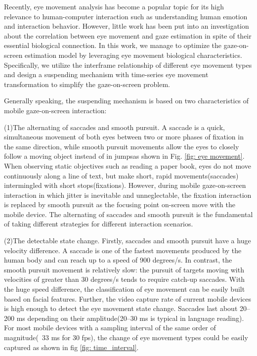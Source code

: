 \documentclass[acmlarge]{acmart}
\begin{document}
Recently, eye movement analysis has become a popular topic for its high relevance to human-computer interaction such as understanding human emotion\cite{alghowinem2013eye} and interaction behavior\cite{lin2019eog}. However, little work has been put into an investigation about the correlation between eye movement and gaze estimation in spite of their essential biological connection. In this work, we manage to optimize the gaze-on-screen estimation model by leveraging eye movement biological characteristics. Specifically, we utilize the interframe relationship of different eye movement types and design a suspending mechanism with time-series eye movement transformation to simplify the gaze-on-screen problem.



Generally speaking, the suspending mechanism is based on two characteristics of mobile gaze-on-screen interaction:

(1)The alternating of saccades and smooth pursuit. A saccade is a quick, simultaneous movement of both eyes between two or more phases of fixation in the same direction\cite{fuchs1967saccadic}, while smooth pursuit movements allow the eyes to closely follow a moving object instead of in jumps\cite{grasse1992analysis}as shown in Fig. \ref{fig: eye movement}. When observing static objectives such as reading a paper book, eyes do not move continuously along a line of text, but make short, rapid movements(saccades) intermingled with short stops(fixations)\cite{o1980control}. However, during mobile gaze-on-screen interaction in which jitter is inevitable and unneglectable\cite{peguero2016assessing}, the fixation interaction is replaced by smooth pursuit as the focusing point on-screen move with the mobile device. The alternating of saccades and smooth pursuit is the fundamental of taking different strategies for different interaction scenarios.

(2)The detectable state change. Firstly, saccades and smooth pursuit have a huge velocity difference. A saccade is one of the fastest movements produced by the human body and can reach up to a speed of 900 degrees/s\cite{fuchs1967saccadic}. In contrast, the smooth pursuit movement is relatively slow: the pursuit of targets moving with velocities of greater than 30 degrees/s tends to require catch-up saccades\cite{britannica1987sensory}. With the huge speed difference, the classification of eye movement can be easily built based on facial features. Further, the video capture rate of current mobile devices is high enough to detect the eye movement state change. Saccades last about 20–200 ms depending on their amplitude(20–30 ms is typical in language reading)\cite{afflerbach2015handbook}. For most mobile devices with a sampling interval of the same order of magnitude(~33 ms for 30 fps), the change of eye movement types could be easily captured as shown in fig \ref{fig: time_interval}.
\end{document}

